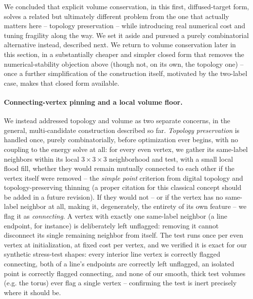 \documentclass[journal]{vgtc}                     %
\begin{document}
We concluded that explicit volume conservation, in this first, diffused-target form, solves a related but ultimately different problem from the one that actually matters here -- topology preservation -- while introducing real numerical cost and tuning fragility along the way. We set it aside and pursued a purely combinatorial alternative instead, described next. We return to volume conservation later in this section, in a substantially cheaper and simpler closed form that removes the numerical-stability objection above (though not, on its own, the topology one) -- once a further simplification of the construction itself, motivated by the two-label case, makes that closed form available.

\paragraph{Connecting-vertex pinning and a local volume floor.} We instead addressed topology and volume as two separate concerns, in the general, multi-candidate construction described so far. \emph{Topology preservation} is handled once, purely combinatorially, before optimization ever begins, with no coupling to the energy solve at all: for every even vertex, we gather its same-label neighbors within its local $3\times3\times3$ neighborhood and test, with a small local flood fill, whether they would remain mutually connected to each other if the vertex itself were removed -- the \emph{simple point} criterion from digital topology and topology-preserving thinning (a proper citation for this classical concept should be added in a future revision). If they would not -- or if the vertex has no same-label neighbor at all, making it, degenerately, the entirety of its own feature -- we flag it as \emph{connecting}. A vertex with exactly one same-label neighbor (a line endpoint, for instance) is deliberately left unflagged: removing it cannot disconnect its single remaining neighbor from itself. The test runs once per even vertex at initialization, at fixed cost per vertex, and we verified it is exact for our synthetic stress-test shapes: every interior line vertex is correctly flagged connecting, both of a line's endpoints are correctly left unflagged, an isolated point is correctly flagged connecting, and none of our smooth, thick test volumes (e.g. the torus) ever flag a single vertex -- confirming the test is inert precisely where it should be.
\end{document}
